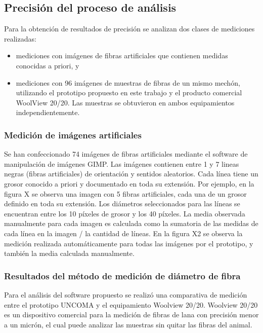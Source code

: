 \documentclass[runningheads,a4paper]{llncs}
\begin{document}
\subsection{Precisión del proceso de análisis}

Para la obtención de resultados de precisión se analizan dos clases de mediciones realizadas: 
\begin{itemize}
\item mediciones con imágenes de fibras artificiales que contienen medidas conocidas a priori, y
\item mediciones con 96 imágenes de muestras de fibras de un mismo mechón, utilizando el prototipo propuesto en este trabajo y el producto comercial WoolView 20/20. Las muestras se obtuvieron en ambos equipamientos independientemente.
\end{itemize}

\subsubsection{Medición de imágenes artificiales}

Se han confeccionado 74 imágenes de fibras artificiales mediante el software de manipulación de imágenes GIMP. Las imágenes contienen entre 1 y 7 lineas negras (fibras artificiales) de orientación  y sentidos aleatorios. Cada línea tiene un grosor conocido a priori y documentado en toda su extensión. Por ejemplo, en la figura X se observa una imagen con 5 fibras artificiales, cada una de un grosor definido en toda su extensión. Los diámetros seleccionados para las líneas se encuentran entre los 10 píxeles de grosor y los 40 píxeles. La media observada manualmente para cada imagen es calculada como la sumatoria de las medidas de cada línea en la imagen / la cantidad de líneas.
En la figura X2 se observa la medición realizada automáticamente para todas las imágenes por el prototipo, y también la media calculada manualmente. 

\subsubsection{Resultados del método de medición de diámetro de fibra} 

Para el análisis del software propuesto se realizó una comparativa de medición entre el prototipo UNCOMA y el equipamiento Woolview 20/20. 
Woolview 20/20 es un dispositivo comercial para la medición de fibras de lana con precisión menor a un micrón, el cual puede analizar las muestras sin quitar las fibras del animal. 
\end{document}
